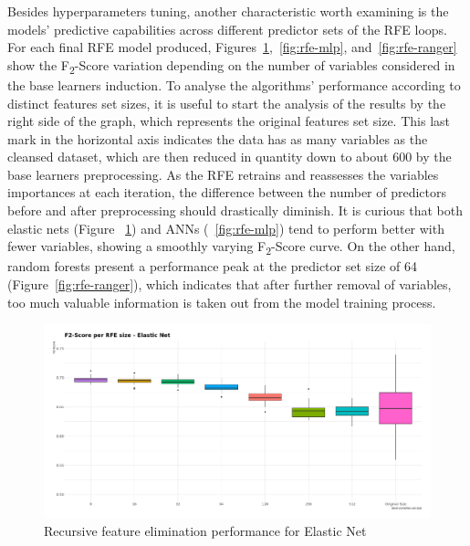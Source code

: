 Besides hyperparameters tuning, another characteristic worth examining is the models' predictive capabilities across different predictor sets of the RFE loops.
For each final RFE model produced, Figures~\ref{fig:rfe-glmnet},~\ref{fig:rfe-mlp}, and~\ref{fig:rfe-ranger} show the F\textsubscript{2}-Score variation depending on the number of variables considered in the base learners induction.
To analyse the algorithms' performance according to distinct features set sizes, it is useful to start the analysis of the results by the right side of the graph, which represents the original features set size.
This last mark in the horizontal axis indicates the data has as many variables as the cleansed dataset, which are then reduced in quantity down to about 600 by the base learners preprocessing.
As the RFE retrains and reassesses the variables importances at each iteration, the difference between the number of predictors before and after preprocessing should drastically diminish.
It is curious that both elastic nets (Figure ~\ref{fig:rfe-glmnet}) and ANNs (~\ref{fig:rfe-mlp}) tend to perform better with fewer variables, showing a smoothly varying F\textsubscript{2}-Score curve.
On the other hand, random forests present a performance peak at the predictor set size of 64 (Figure~\ref{fig:rfe-ranger}), which indicates that after further removal of variables, too much valuable information is taken out from the model training process.

\begin{figure}[H]
    \caption{Recursive feature elimination performance for Elastic Net}
    \centerline{\includegraphics[scale=.21]{../reports/results/models_and_evals/summary/rfe_glmnet.png}}
    \label{fig:rfe-glmnet}
\end{figure}

